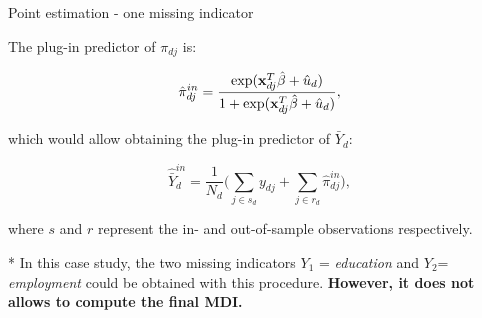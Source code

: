 \documentclass [xcolor=svgnames, t, 9pt] {beamer}
\begin{document}
\begin{frame}{Point estimation - one missing indicator}

\vspace{0.3cm}

The plug-in predictor of $\pi_{dj}$ is:
       
       \begin{equation}
           \hat{\pi}^{in}_{dj} = \frac{\text{exp}(\bold{x}^{T}_{dj}\hat{\beta}+\hat{u}_d)} {{1+\text{exp}(\bold{x}^{T}_{dj}\hat{\beta}+\hat{u}_d)}},
       \end{equation}

\vspace{0.5cm}
       
which would allow obtaining the plug-in predictor of $\bar{Y}_d$:

\vspace{0.3cm}

\begin{equation}
    \hat{\bar{Y}}^{in}_{d} = \frac{1}{N_d} \big( \sum_{j \in s_d} y_{dj} + \sum_{j \in r_d} \hat{\pi}^{in}_{dj} \big), 
\end{equation}

\vspace{0.3cm}

where $s$ and $r$ represent the in- and out-of-sample observations respectively.
\pause

\vspace{0.5cm}

* In this case study, the two missing indicators $Y_{1}$ = \textit{education} and $Y_{2}$= \textit{employment} could be obtained with this procedure. \textbf{However, it does not allows to compute the final MDI.}






\end{frame}
\end{document}
